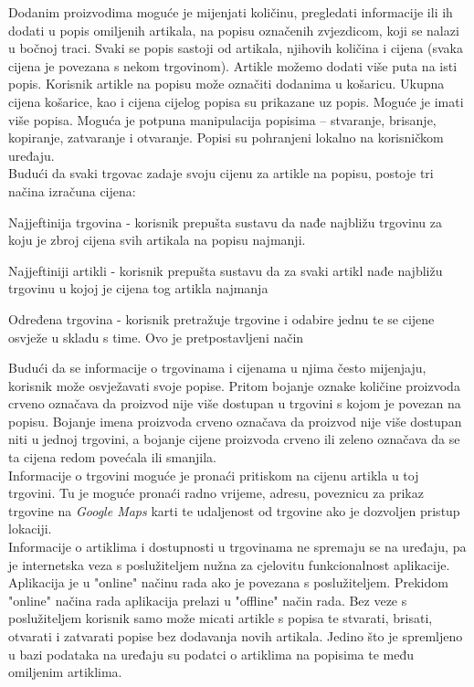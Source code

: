     Dodanim proizvodima moguće je mijenjati količinu, pregledati informacije ili ih dodati u popis omiljenih artikala, na popisu označenih zvjezdicom, koji se nalazi u bočnoj traci. Svaki se popis sastoji od artikala, njihovih količina i cijena (svaka cijena je povezana s nekom trgovinom). Artikle možemo dodati više puta na isti popis. Korisnik artikle na popisu može označiti dodanima u košaricu. Ukupna cijena košarice, kao i cijena cijelog popisa su prikazane uz popis. Moguće je imati više popisa. Moguća je potpuna manipulacija popisima – stvaranje, brisanje, kopiranje, zatvaranje i otvaranje. Popisi su pohranjeni lokalno na korisničkom uređaju. \\
    
    Budući da svaki trgovac zadaje svoju cijenu za artikle na popisu, postoje tri načina izračuna cijena:
    \begin{packed_item}
        \item Najjeftinija trgovina - korisnik prepušta sustavu da nađe najbližu trgovinu za koju je zbroj cijena svih artikala na popisu najmanji.
        \item Najjeftiniji artikli - korisnik prepušta sustavu da za svaki artikl nađe najbližu trgovinu u kojoj je cijena tog artikla najmanja
        \item Određena trgovina - korisnik pretražuje trgovine i odabire jednu te se cijene osvježe u skladu s time. Ovo je pretpostavljeni način
    \end{packed_item}
    
    Budući da se informacije o trgovinama i cijenama u njima često mijenjaju, korisnik može osvježavati svoje popise. Pritom bojanje oznake količine proizvoda crveno označava da proizvod nije više dostupan u trgovini s kojom je povezan na popisu. Bojanje imena proizvoda crveno označava da proizvod nije više dostupan niti u jednoj trgovini, a bojanje cijene proizvoda crveno ili zeleno označava da se ta cijena redom povećala ili smanjila. \\
    
    Informacije o trgovini moguće je pronaći pritiskom na cijenu artikla u toj trgovini. Tu je moguće pronaći radno vrijeme, adresu, poveznicu za prikaz trgovine na \textit{Google Maps} karti te udaljenost od trgovine ako je dozvoljen pristup lokaciji. \\
    
    Informacije o artiklima i dostupnosti u trgovinama ne spremaju se na uređaju, pa je internetska veza s poslužiteljem nužna za cjelovitu funkcionalnost aplikacije. Aplikacija je u "online" načinu rada ako je povezana s poslužiteljem. Prekidom "online" načina rada aplikacija prelazi u "offline" način rada. Bez veze s poslužiteljem korisnik samo može micati artikle s popisa te stvarati, brisati, otvarati i zatvarati popise bez dodavanja novih artikala. Jedino što je spremljeno u bazi podataka na uređaju su podatci o artiklima na popisima te među omiljenim artiklima. \\
    

